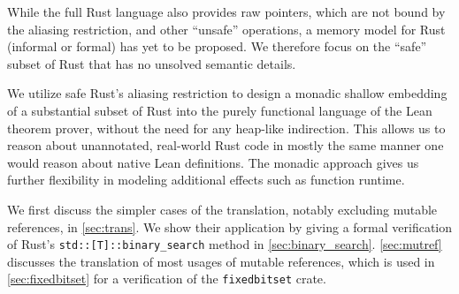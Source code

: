 While the full Rust language also provides raw pointers, which are not bound by
the aliasing restriction, and other ``unsafe'' operations, a
memory model for Rust (informal or formal) has yet to be proposed. We therefore focus on the ``safe''
subset of Rust that has no unsolved semantic details.

We utilize safe Rust's aliasing restriction to design a monadic shallow embedding of a
substantial subset of Rust
into the purely functional language of the Lean~\cite{de2015lean} theorem prover, without the need
for any heap-like indirection. This allows us to
reason about unannotated, real-world Rust code in mostly the same manner one would
reason about native Lean definitions. The monadic approach gives us further
flexibility in modeling additional effects such as function runtime.

We first discuss the simpler cases of the
translation, notably excluding mutable references, in \autoref{sec:trans}. We
show their application by giving a formal verification of Rust's
\verb!std::[T]::binary_search! method in \autoref{sec:binary_search}.
\autoref{sec:mutref} discusses the translation of most usages of mutable
references, which is used in \autoref{sec:fixedbitset} for a verification of the
\texttt{fixedbitset} crate.